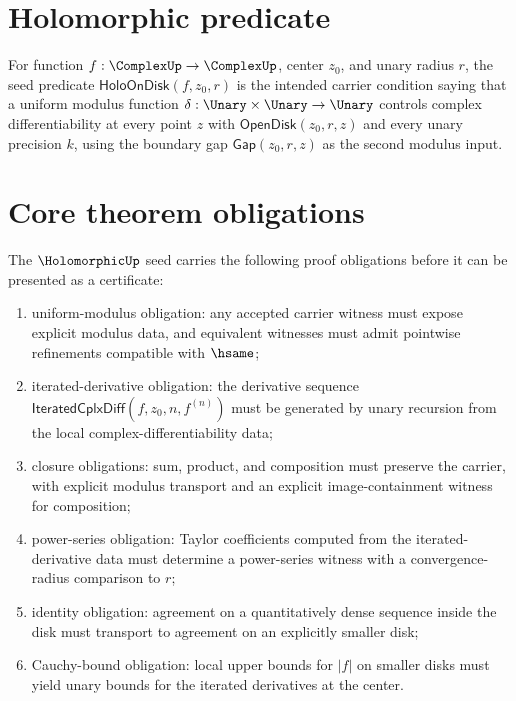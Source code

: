 \section{Holomorphic predicate}

\begin{definition}
\label{def:holo-on-disk}
For function $f : \ComplexUp \to \ComplexUp$, center $z_0$, and unary radius $r$, the seed predicate $\mathsf{HoloOnDisk}(f, z_0, r)$ is the intended carrier condition saying that a uniform modulus function $\delta : \Unary \times \Unary \to \Unary$ controls complex differentiability at every point $z$ with $\mathsf{OpenDisk}(z_0, r, z)$ and every unary precision $k$, using the boundary gap $\mathsf{Gap}(z_0, r, z)$ as the second modulus input.
\end{definition}

\section{Core theorem obligations}

\begin{definition}
\label{def:holo-core-theorem-obligations}
The $\HolomorphicUp$ seed carries the following proof obligations before it can be presented as a certificate:
\begin{enumerate}
  \item uniform-modulus obligation: any accepted carrier witness must expose explicit modulus data, and equivalent witnesses must admit pointwise refinements compatible with $\hsame$;
  \item iterated-derivative obligation: the derivative sequence $\mathsf{IteratedCplxDiff}(f, z_0, n, f^{(n)})$ must be generated by unary recursion from the local complex-differentiability data;
  \item closure obligations: sum, product, and composition must preserve the carrier, with explicit modulus transport and an explicit image-containment witness for composition;
  \item power-series obligation: Taylor coefficients computed from the iterated-derivative data must determine a power-series witness with a convergence-radius comparison to $r$;
  \item identity obligation: agreement on a quantitatively dense sequence inside the disk must transport to agreement on an explicitly smaller disk;
  \item Cauchy-bound obligation: local upper bounds for $|f|$ on smaller disks must yield unary bounds for the iterated derivatives at the center.
\end{enumerate}
\end{definition}

